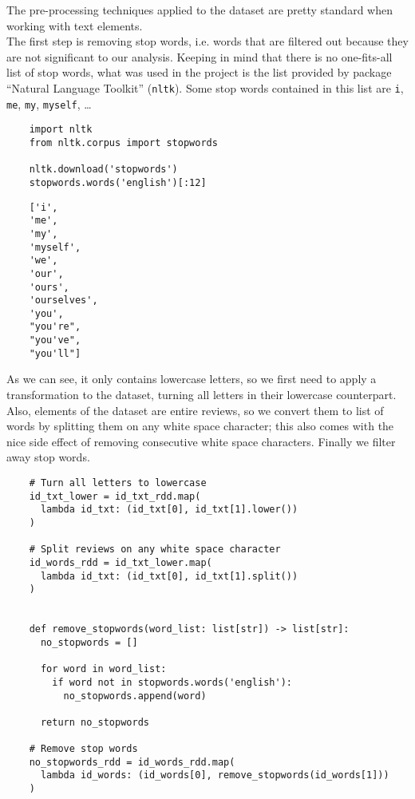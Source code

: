 \documentclass{article}
\begin{document}
  The pre-processing techniques applied to the dataset are pretty standard when
  working with text elements. \\
  The first step is removing stop words, i.e. words that are filtered out
  because they are not significant to our analysis. Keeping in mind that there
  is no one-fits-all list of stop words, what was used in the project is the
  list provided by package “Natural Language Toolkit” (\texttt{nltk}). Some
  stop words contained in this list are \texttt i, \texttt{me}, \texttt{my},
  \texttt{myself}, \dots \\
  \begin{verbatim}
    import nltk
    from nltk.corpus import stopwords

    nltk.download('stopwords')
    stopwords.words('english')[:12]
  \end{verbatim}
  \begin{verbatim}
    ['i',
    'me',
    'my',
    'myself',
    'we',
    'our',
    'ours',
    'ourselves',
    'you',
    "you're",
    "you've",
    "you'll"]
  \end{verbatim}
  As we can see, it only contains lowercase letters, so we first need to apply
  a transformation to the dataset, turning all letters in their lowercase
  counterpart. Also, elements of the dataset are entire reviews, so we convert
  them to list of words by splitting them on any white space character; this
  also comes with the nice side effect of removing consecutive white space
  characters. Finally we filter away stop words. \\
  \begin{verbatim}
    # Turn all letters to lowercase
    id_txt_lower = id_txt_rdd.map(
      lambda id_txt: (id_txt[0], id_txt[1].lower())
    )

    # Split reviews on any white space character
    id_words_rdd = id_txt_lower.map(
      lambda id_txt: (id_txt[0], id_txt[1].split())
    )


    def remove_stopwords(word_list: list[str]) -> list[str]:
      no_stopwords = []

      for word in word_list:
        if word not in stopwords.words('english'):
          no_stopwords.append(word)

      return no_stopwords

    # Remove stop words
    no_stopwords_rdd = id_words_rdd.map(
      lambda id_words: (id_words[0], remove_stopwords(id_words[1]))
    )
  \end{verbatim}
\end{document}
